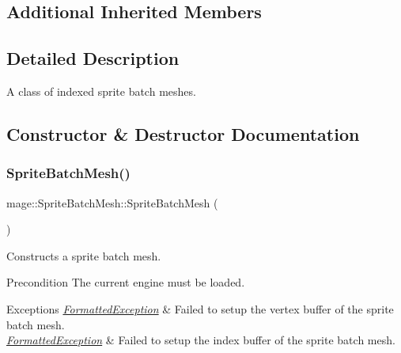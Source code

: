 \subsection*{Additional Inherited Members}


\subsection{Detailed Description}
A class of indexed sprite batch meshes. 

\subsection{Constructor \& Destructor Documentation}
\hypertarget{classmage_1_1_sprite_batch_mesh_ae5b2219aa3d5bbfb216036dad9c12e5d}{}\label{classmage_1_1_sprite_batch_mesh_ae5b2219aa3d5bbfb216036dad9c12e5d} 
\subsubsection{\texorpdfstring{Sprite\+Batch\+Mesh()}{SpriteBatchMesh()}\hspace{0.1cm}{\footnotesize\ttfamily [1/4]}}
{\footnotesize\ttfamily mage\+::\+Sprite\+Batch\+Mesh\+::\+Sprite\+Batch\+Mesh (\begin{DoxyParamCaption}{ }\end{DoxyParamCaption})}

Constructs a sprite batch mesh.

\begin{DoxyPrecond}{Precondition}
The current engine must be loaded. 
\end{DoxyPrecond}

\begin{DoxyExceptions}{Exceptions}
{\em \hyperlink{structmage_1_1_formatted_exception}{Formatted\+Exception}} & Failed to setup the vertex buffer of the sprite batch mesh. \\
\hline
{\em \hyperlink{structmage_1_1_formatted_exception}{Formatted\+Exception}} & Failed to setup the index buffer of the sprite batch mesh. \\
\hline
\end{DoxyExceptions}
\hypertarget{classmage_1_1_sprite_batch_mesh_a7664804b05d08b7126c3efedee5c2588}{}\label{classmage_1_1_sprite_batch_mesh_a7664804b05d08b7126c3efedee5c2588} 
